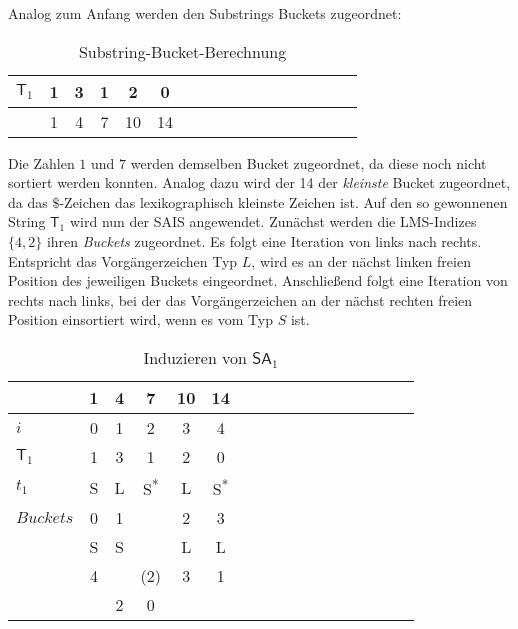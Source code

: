 \noindent Analog zum Anfang werden den Substrings Buckets zugeordnet:

\begin{table}[H]
\centering
  \begin{tabular}{ | l | c | c | c | c | c | c | c | c | c | c | c | c | c | c | c | c | }
    \hline
        $\mathsf{T}_1$ & 1 & 3 & 1 & 2 & 0 \\ \hline
              & 1 & 4 & 7 & 10 & 14  \\
    \hline
  \end{tabular}
  \caption{Substring-Bucket-Berechnung}
\end{table}
\bigskip

\noindent Die Zahlen $1$ und $7$ werden demselben Bucket zugeordnet, da diese noch nicht sortiert werden konnten. Analog dazu wird der 14 der \textit{kleinste} Bucket zugeordnet, da das $\$$-Zeichen das lexikographisch kleinste Zeichen ist. Auf den so gewonnenen String $\mathsf{T}_1$ wird nun der SAIS angewendet. Zunächst werden die LMS-Indizes $\{4, 2\}$ ihren \textit{Buckets} zugeordnet. Es folgt eine Iteration von links nach rechts. Entspricht das Vorgängerzeichen Typ $L$, wird es an der nächst linken freien Position des jeweiligen Buckets eingeordnet. Anschließend folgt eine Iteration von rechts nach links, bei der das Vorgängerzeichen an der nächst rechten freien Position einsortiert wird, wenn es vom Typ $S$ ist.

\begin{table}[H]
\centering
  \begin{tabular}{ | l | c | c | c | c | c | c | c | c | c | c | c | c | c | c | c | c | }
    \hline
          & \tiny{1} & \tiny{4} & \tiny{7} & \tiny{10} & \tiny{14} \\ \hline
      $i$ & 0 & 1 & 2 & 3 & 4  \\ \hline
    $\mathsf{T}_1$ & 1 & 3 & 1 & 2 & 0  \\ \hline
      $t_1$ & S & L & S\textsuperscript{*} & L & S\textsuperscript{*}  \\ \hline
$Buckets$ & 0 & \multicolumn{1}{c}{1} & & 2 & 3 \\ \hline
          & S & \multicolumn{1}{c}{S} & & L & L \\ \hline
          & 4 & & (2) & 3 & 1 \\ \hline
          & & 2 & 0 & & \\
    \hline
  \end{tabular}
  \caption{Induzieren von $\mathsf{SA}_1$}
\end{table}
\bigskip

